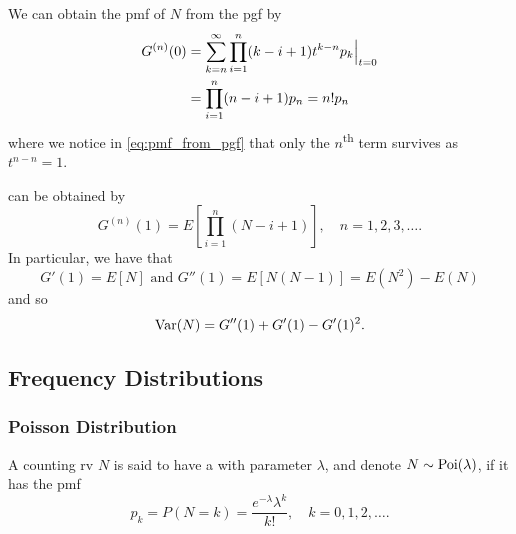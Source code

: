 \documentclass[notoc,notitlepage]{tufte-book}
\begin{document}
We can obtain the pmf of $N$ from the pgf by
\begin{align}
  G^{(n)}(0) &= \sum_{k=n}^{\infty} \prod_{i=1}^{n} (k - i + 1) t^{k - n} p_k \Big|_{t = 0}^{} \nonumber \\
             &= \prod_{i=1}^{n} ( n - i + 1 ) p_n = n! p_n \label{eq:pmf_from_pgf}
\end{align}
where we notice in \cref{eq:pmf_from_pgf} that only the $n$\textsuperscript{th} term survives as $t^{n - n} = 1$.

 can be obtained by
\begin{equation*}
  G^{(n)}(1) = E\left[ \prod_{i=1}^{n} ( N - i + 1 ) \right], \quad n = 1, 2, 3, \ldots.
\end{equation*}
In particular, we have that
\begin{equation*}
  G'(1) = E[N] \text{ and } G''(1) = E[N(N - 1)] = E(N^2) - E(N)
\end{equation*}
and so
\begin{equation*}
  \operatorname{Var}(N) = G''(1) + G'(1) - G'(1)^2.
\end{equation*}

\subsection{Frequency Distributions}%
\label{sub:frequency_distributions}

\subsubsection{Poisson Distribution}%
\label{ssub:poisson_distribution}

\begin{defn}\label{defn:poisson_distribution}
  A counting rv $N$ is said to have a  with parameter $\lambda$, and denote $N \sim \operatorname{Poi}(\lambda)$, if it has the pmf
  \begin{equation*}
    p_k = P(N = k) = \frac{e^{-\lambda} \lambda^k}{k!}, \quad k = 0, 1, 2, \ldots.
  \end{equation*}
\end{defn}
\end{document}
